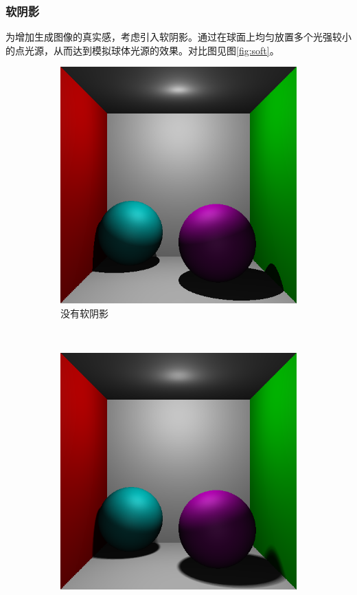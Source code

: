 \subsubsection {软阴影}
为增加生成图像的真实感，考虑引入软阴影。通过在球面上均匀放置多个光强较小的点光源，从而达到模拟球体光源的效果。对比图见图\ref{fig:soft}。
\begin{figure}
    \centering
    \begin{subfigure}{0.45\textwidth}
        \includegraphics[width=\textwidth]{./img/without_soft.png}
        \caption{没有软阴影}
    \end{subfigure}
    ~
    \begin{subfigure}{0.45\textwidth}
        \includegraphics[width=\textwidth]{./img/soft.png}

\end{subfigure}
\end{figure}
